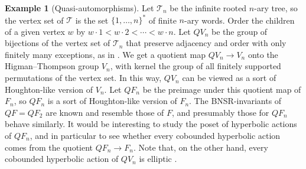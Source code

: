 \documentclass[reqno,12pt]{amsart}\setcounter{tocdepth}{1}
\theoremstyle{definition}
\newtheorem{example}[theorem]{Example}
\numberwithin{equation}{section}
\begin{document}
\begin{example}[Quasi-automorphisms]
Let $\mathcal{T}_n$ be the infinite rooted $n$-ary tree, so the vertex set of $\mathcal{T}$ is the set $\{1,\dots,n\}^*$ of finite $n$-ary words. Order the children of a given vertex $w$ by $w\cdot 1<w\cdot 2<\cdots<w\cdot n$. Let $QV_n$ be the group of bijections of the vertex set of $\mathcal{T}_n$ that preserve adjacency and order with only finitely many exceptions, as in \cite{lehnert08}. We get a quotient map $QV_n \to V_n$ onto the Higman--Thompson group $V_n$, with kernel the group of all finitely supported permutations of the vertex set. In this way, $QV_n$ can be viewed as a sort of Houghton-like version of $V_n$. Let $QF_n$ be the preimage under this quotient map of $F_n$, so $QF_n$ is a sort of Houghton-like version of $F_n$. The BNSR-invariants of $QF=QF_2$ are known \cite{nucinkis18} and resemble those of $F$, and presumably those for $QF_n$ behave similarly. It would be interesting to study the poset of hyperbolic actions of $QF_n$, and in particular to see whether every cobounded hyperbolic action comes from the quotient $QF_n\to F_n$. Note that, on the other hand, every cobounded hyperbolic action of $QV_n$ is elliptic \cite[Theorem 1.6.7]{NL}.
\end{example}





\end{document}
